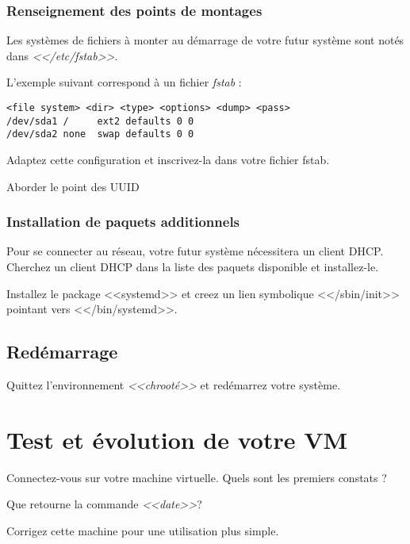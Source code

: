 \documentclass[11pt]{article}
\begin{document}
\subsubsection{Renseignement des points de montages}

Les systèmes de fichiers à monter au démarrage de votre futur système sont
notés dans \emph{<</etc/fstab>>}.

L'exemple suivant correspond à un fichier \emph{fstab} :

\begin{verbatim} 
<file system> <dir> <type> <options> <dump> <pass> 
/dev/sda1 /		ext2 defaults 0 0
/dev/sda2 none	swap defaults 0 0
\end{verbatim} 

Adaptez cette configuration et inscrivez-la dans votre fichier fstab.

\begin{solution}
Aborder le point des UUID
\end{solution}

\subsubsection{Installation de paquets additionnels}

Pour se connecter au réseau, votre futur système nécessitera un client DHCP.
Cherchez un client DHCP dans la liste des paquets disponible et installez-le.

Installez le package <<systemd>> et creez un lien symbolique <</sbin/init>> pointant vers <</bin/systemd>>.

\subsection{Redémarrage}

Quittez l'environnement \emph{<<chrooté>>} et redémarrez votre système.

\section{Test et évolution de votre VM}

Connectez-vous sur votre machine virtuelle. Quels sont les premiers constats ?

Que retourne la commande \emph{<<date>>}?

Corrigez cette machine pour une utilisation plus simple.
\end{document}
